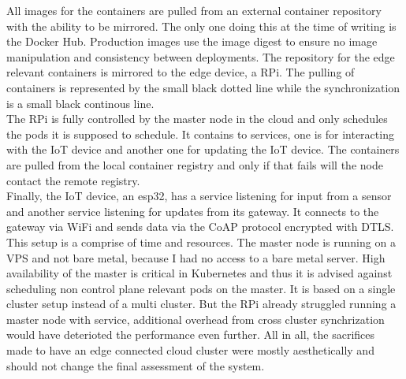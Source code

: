 All images for the containers are pulled from an external container repository with the ability to be mirrored. The only one doing this at the time of writing is the Docker Hub. Production images use the image digest to ensure no image manipulation and consistency between deployments. The repository for the edge relevant containers is mirrored to the edge device, a RPi. The pulling of containers is represented by the small black dotted line while the synchronization is a small black continous line.\\
The RPi is fully controlled by the master node in the cloud and only schedules the pods it is supposed to schedule. It contains to services, one is for interacting with the IoT device and another one for updating the IoT device. The containers are pulled from the local container registry and only if that fails will the node contact the remote registry. \\
Finally, the IoT device, an esp32, has a service listening for input from a sensor and another service listening for updates from its gateway. It connects to the gateway via WiFi and sends data via the CoAP protocol encrypted with DTLS.\\
This setup is a comprise of time and resources. The master node is running on a VPS and not bare metal, because I had no access to a bare metal server. High availability of the master is critical in Kubernetes and thus it is advised against scheduling non control plane relevant pods on the master. It is based on a single cluster setup instead of a multi cluster. 
But the RPi already struggled running a master node with service, additional overhead from cross cluster synchrization would have deterioted the performance even further. All in all, the sacrifices made to have an edge connected cloud cluster were mostly aesthetically and should not change the final assessment of the system.

